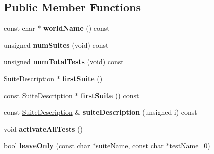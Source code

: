 \subsection*{Public Member Functions}
\begin{DoxyCompactItemize}
\item 
\hypertarget{classCxxTest_1_1RealWorldDescription_a7fa35da37da789d2d1661465b1380587}{const char $\ast$ {\bfseries world\-Name} () const }\label{classCxxTest_1_1RealWorldDescription_a7fa35da37da789d2d1661465b1380587}

\item 
\hypertarget{classCxxTest_1_1RealWorldDescription_aaca249bcca07f618a34d0ba6ebd31574}{unsigned {\bfseries num\-Suites} (void) const }\label{classCxxTest_1_1RealWorldDescription_aaca249bcca07f618a34d0ba6ebd31574}

\item 
\hypertarget{classCxxTest_1_1RealWorldDescription_a3d2c1cea9a765a75ce9cdda97f86b08e}{unsigned {\bfseries num\-Total\-Tests} (void) const }\label{classCxxTest_1_1RealWorldDescription_a3d2c1cea9a765a75ce9cdda97f86b08e}

\item 
\hypertarget{classCxxTest_1_1RealWorldDescription_aa9af72569dbe6d0dd4fccc9f0bbd4b0d}{\hyperlink{classCxxTest_1_1SuiteDescription}{Suite\-Description} $\ast$ {\bfseries first\-Suite} ()}\label{classCxxTest_1_1RealWorldDescription_aa9af72569dbe6d0dd4fccc9f0bbd4b0d}

\item 
\hypertarget{classCxxTest_1_1RealWorldDescription_a56d95267a75db4aa353f06df22ca819c}{const \hyperlink{classCxxTest_1_1SuiteDescription}{Suite\-Description} $\ast$ {\bfseries first\-Suite} () const }\label{classCxxTest_1_1RealWorldDescription_a56d95267a75db4aa353f06df22ca819c}

\item 
\hypertarget{classCxxTest_1_1RealWorldDescription_af55c9a0684886f191ee558435133425d}{const \hyperlink{classCxxTest_1_1SuiteDescription}{Suite\-Description} \& {\bfseries suite\-Description} (unsigned i) const }\label{classCxxTest_1_1RealWorldDescription_af55c9a0684886f191ee558435133425d}

\item 
\hypertarget{classCxxTest_1_1RealWorldDescription_a4d413ee630a6dd87574174d8223cc423}{void {\bfseries activate\-All\-Tests} ()}\label{classCxxTest_1_1RealWorldDescription_a4d413ee630a6dd87574174d8223cc423}

\item 
\hypertarget{classCxxTest_1_1RealWorldDescription_a6095c390b15180cc3cd62f0990e178c9}{bool {\bfseries leave\-Only} (const char $\ast$suite\-Name, const char $\ast$test\-Name=0)}\label{classCxxTest_1_1RealWorldDescription_a6095c390b15180cc3cd62f0990e178c9}


\end{DoxyCompactItemize}
